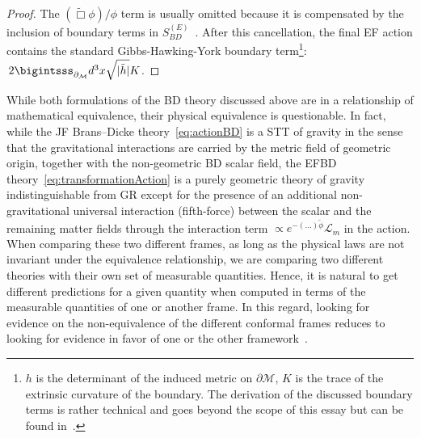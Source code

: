 \begin{proof}
  The $(\tilde{\Box} \phi)/ \phi$ term is usually omitted because it is compensated by the inclusion of boundary terms in $S^{(E)}_{BD}$~\cite{Quiros:2019ktw}. After this cancellation, the final EF action contains the standard Gibbs-Hawking-York boundary term\footnote{$h$ is the determinant of the induced metric on $\partial \mathcal{M}$, $K$ is the trace of the extrinsic curvature of the boundary. The derivation of the discussed boundary terms is rather technical and goes beyond the scope of this essay but can be found in~\cite{Lidsey_2000}.}: $\,2 \bigintsss_{\partial_\mathcal{M}} d^3x \sqrt{|\tilde{h}|}K$.
\end{proof}

While both formulations of the BD theory discussed above are in a relationship of mathematical equivalence, their physical equivalence is questionable. 
In fact, while the JF Brans–Dicke theory~\eqref{eq:actionBD} is a STT of gravity in the sense that the gravitational interactions are carried by the metric field of geometric origin, together with the non-geometric BD scalar field, the EFBD theory~\eqref{eq:transformationAction} is a purely geometric theory of gravity indistinguishable from GR except for the presence of an additional non-gravitational universal interaction (fifth-force) between the scalar and the remaining matter fields through the interaction term $\propto e^{-(\dots)\tilde{\phi}}\mathcal{L}_m$ in the action.
When comparing these two different frames, as long as the physical laws are not invariant under the equivalence relationship, we are comparing two different theories with their own set of measurable quantities. Hence, it is natural to get different predictions for a given quantity when computed in terms of the measurable quantities of one or another frame. 
In this regard, looking for evidence on the non-equivalence of the different conformal frames reduces to looking for evidence in favor of one or the other framework~\cite{Quiros:2019ktw}.